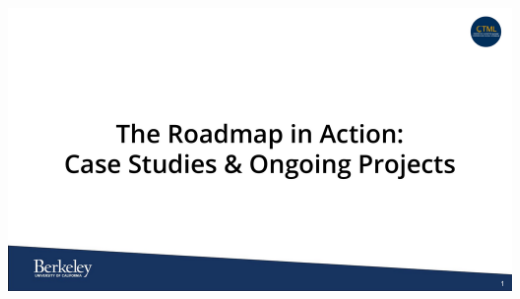 \documentclass[t]{beamer}
\begin{document}

\begin{frame}
\frametitle{}
\vspace{20pt}
\begin{center}
\includegraphics[width=\textwidth]{figures/1-FDA-RWE-Subcommittee.pdf}
\end{center}
\vspace{35pt}
\end{frame}
\end{document}
